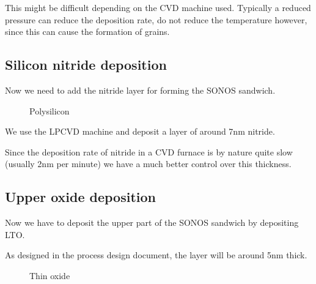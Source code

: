 This might be difficult depending on the CVD machine used. Typically a reduced pressure can reduce the deposition rate, do not reduce the temperature however, since this can cause the formation of grains.

\subsection{Silicon nitride deposition}\label{step_depositing_sonos_nitride}

Now we need to add the nitride layer for forming the SONOS sandwich.

\begin{figure}[H]
	\centering
	\begin{tikzpicture}[node distance = 3cm, auto, thick,scale=\CrossSectionOnly, every node/.style={transform shape}]
		
	\end{tikzpicture}
	\begin{tikzpicture}[node distance = 3cm, auto, thick,scale=\CrossSectionOnly, every node/.style={transform shape}]
		
	\end{tikzpicture}
	\caption{Polysilicon}
\end{figure}

We use the LPCVD machine and deposit a layer of around 7nm nitride.

Since the deposition rate of nitride in a CVD furnace is by nature quite slow (usually 2nm per minute) we have a much better control over this thickness.

\newpage

\subsection{Upper oxide deposition}\label{step_growing_gate_oxide}

Now we have to deposit the upper part of the SONOS sandwich by depositing LTO.

As designed in the process design document, the layer will be around 5nm thick.

\begin{figure}[H]
	\centering
	\begin{tikzpicture}[node distance = 3cm, auto, thick,scale=\CrossSectionOnly, every node/.style={transform shape}]
		
	\end{tikzpicture}
	\begin{tikzpicture}[node distance = 3cm, auto, thick,scale=\CrossSectionOnly, every node/.style={transform shape}]
		
	\end{tikzpicture}
	\caption{Thin oxide}
\end{figure}

